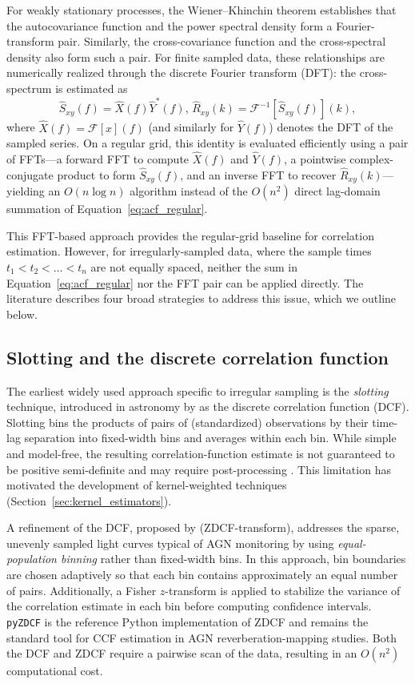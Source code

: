 \documentclass[twocolumn,10pt]{article}
\newcommand{\pyzdcf}{\texttt{pyZDCF}\xspace}
\begin{document}
For weakly stationary processes, the Wiener–Khinchin theorem establishes that the autocovariance function and the power spectral density form a Fourier-transform pair. Similarly, the cross-covariance function and the cross-spectral density also form such a pair. For finite sampled data, these relationships are numerically realized through the discrete Fourier transform (DFT): the cross-spectrum is estimated as
\begin{equation}
\hat S_{xy}(f)=\hat X(f)\hat Y^*(f),
\,
\hat R_{xy}(k)=\mathcal F^{-1}\left[\hat S_{xy}(f)\right](k),
\label{eq:wienerkhinchin}
\end{equation}
where $\hat X(f)=\mathcal F[x](f)$ (and similarly for $\hat Y(f)$) denotes the DFT of the sampled series. On a regular grid, this identity is evaluated efficiently using a pair of FFTs---a forward FFT to compute $\hat X(f)$ and $\hat Y(f)$, a pointwise complex-conjugate product to form $\hat S_{xy}(f)$, and an inverse FFT to recover $\hat R_{xy}(k)$---yielding an $O(n\log n)$ algorithm instead of the $O(n^2)$ direct lag-domain summation of Equation~\ref{eq:acf_regular}.

This FFT-based approach provides the regular-grid baseline for correlation estimation. However, for irregularly-sampled data, where the sample times $t_1 < t_2 < \dots < t_n$ are not equally spaced, neither the sum in Equation~\ref{eq:acf_regular} nor the FFT pair can be applied directly. The literature describes four broad strategies to address this issue, which we outline below.
%
\subsection{Slotting and the discrete correlation function}
\label{sec:slotting}
%
The earliest widely used approach specific to irregular sampling is the \textit{slotting} technique, introduced in astronomy by \cite{edelson1988} as the discrete correlation function (DCF). Slotting bins the products of pairs of (standardized) observations by their time-lag separation into fixed-width bins and averages within each bin. While simple and model-free, the resulting correlation-function estimate is not guaranteed to be positive semi-definite and may require post-processing \citep{Rehfeld2011}. This limitation has motivated the development of kernel-weighted techniques (Section~\ref{sec:kernel_estimators}).

A refinement of the DCF, proposed by \cite{alexander97} (ZDCF-transform), addresses the sparse, unevenly sampled light curves typical of AGN monitoring by using \textit{equal-population binning} rather than fixed-width bins. In this approach, bin boundaries are chosen adaptively so that each bin contains approximately an equal number of pairs. Additionally, a Fisher $z$-transform \citep{Fisher1915} is applied to stabilize the variance of the correlation estimate in each bin before computing confidence intervals. \pyzdcf \citep{jankov2022pyzdcf} is the reference Python implementation of ZDCF and remains the standard tool for CCF estimation in AGN reverberation-mapping studies. Both the DCF and ZDCF require a pairwise scan of the data, resulting in an $O(n^2)$ computational cost.
%
\end{document}
